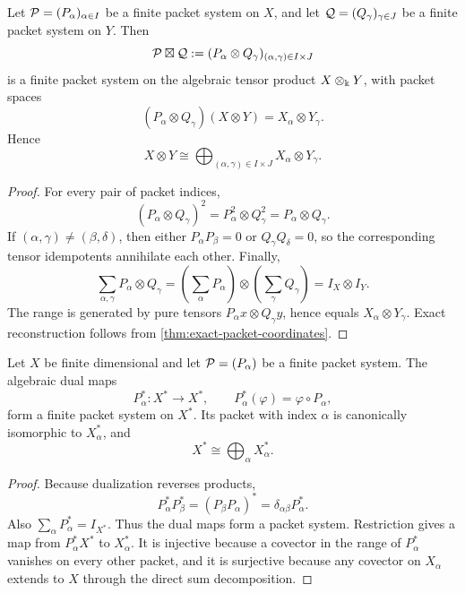 \begin{theorem}
\label{thm:tensor-packet-system}
Let \(\mathcal P=(P_\alpha)_{\alpha\in I}\) be a finite packet system on \(X\), and let \(\mathcal Q=(Q_\gamma)_{\gamma\in J}\) be a finite packet system on \(Y\).  Then
\[
\mathcal P\boxtimes\mathcal Q
:=
(P_\alpha\otimes Q_\gamma)_{(\alpha,\gamma)\in I\times J}
\]
is a finite packet system on the algebraic tensor product \(X\otimes_{\Bbbk}Y\), with packet spaces
\[
(P_\alpha\otimes Q_\gamma)(X\otimes Y)
=X_\alpha\otimes Y_\gamma.
\]
Hence
\[
\boxed{
X\otimes Y
\cong
\bigoplus_{(\alpha,\gamma)\in I\times J}
X_\alpha\otimes Y_\gamma.
}
\]
\end{theorem}

\begin{proof}
For every pair of packet indices,
\[
(P_\alpha\otimes Q_\gamma)^2
=P_\alpha^2\otimes Q_\gamma^2
=P_\alpha\otimes Q_\gamma.
\]
If \((\alpha,\gamma)\neq(\beta,\delta)\), then either \(P_\alpha P_\beta=0\) or \(Q_\gamma Q_\delta=0\), so the corresponding tensor idempotents annihilate each other.  Finally,
\[
\sum_{\alpha,\gamma}P_\alpha\otimes Q_\gamma
=
\left(\sum_\alpha P_\alpha\right)
\otimes
\left(\sum_\gamma Q_\gamma\right)
=I_X\otimes I_Y.
\]
The range is generated by pure tensors \(P_\alpha x\otimes Q_\gamma y\), hence equals \(X_\alpha\otimes Y_\gamma\).  Exact reconstruction follows from \cref{thm:exact-packet-coordinates}.
\end{proof}

\begin{proposition}
\label{prop:dual-packet-system}
Let \(X\) be finite dimensional and let \(\mathcal P=(P_\alpha)\) be a finite packet system.  The algebraic dual maps
\[
P_\alpha^*:X^*\to X^*,
\qquad
P_\alpha^*(\varphi)=\varphi\circ P_\alpha,
\]
form a finite packet system on \(X^*\).  Its packet with index \(\alpha\) is canonically isomorphic to \(X_\alpha^*\), and
\[
X^*\cong\bigoplus_\alpha X_\alpha^*.
\]
\end{proposition}

\begin{proof}
Because dualization reverses products,
\[
P_\alpha^*P_\beta^*=(P_\beta P_\alpha)^*
=\delta_{\alpha\beta}P_\alpha^*.
\]
Also \(\sum_\alpha P_\alpha^*=I_{X^*}\).  Thus the dual maps form a packet system.  Restriction gives a map from \(P_\alpha^*X^*\) to \(X_\alpha^*\).  It is injective because a covector in the range of \(P_\alpha^*\) vanishes on every other packet, and it is surjective because any covector on \(X_\alpha\) extends to \(X\) through the direct sum decomposition.
\end{proof}

